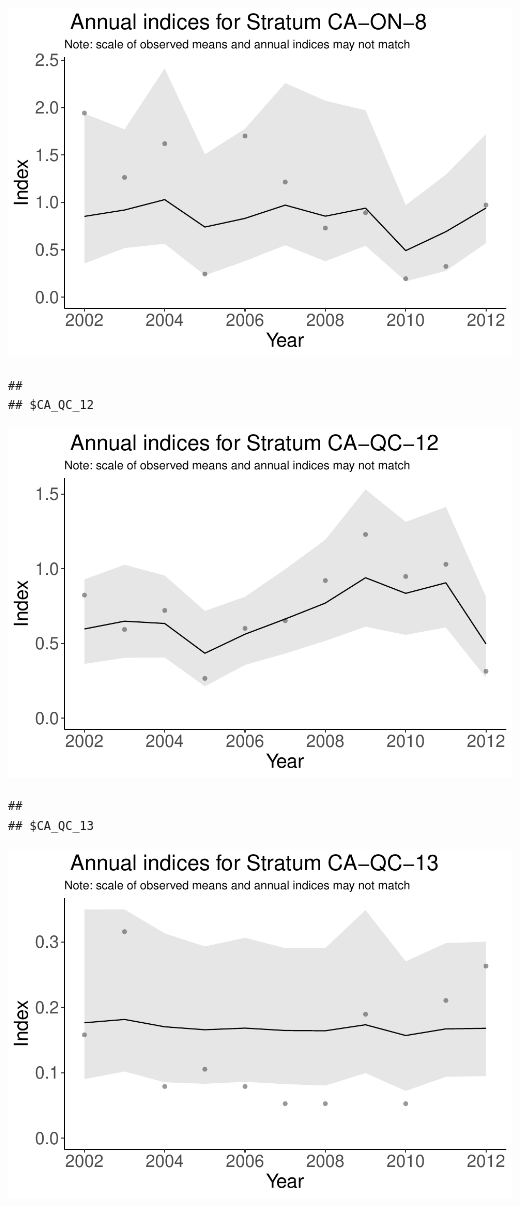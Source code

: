\documentclass[]{article}
\begin{document}
\includegraphics{index_files/figure-latex/unnamed-chunk-7-10.pdf}

\begin{verbatim}
## 
## $CA_QC_12
\end{verbatim}

\includegraphics{index_files/figure-latex/unnamed-chunk-7-11.pdf}

\begin{verbatim}
## 
## $CA_QC_13
\end{verbatim}

\includegraphics{index_files/figure-latex/unnamed-chunk-7-12.pdf}
\end{document}
